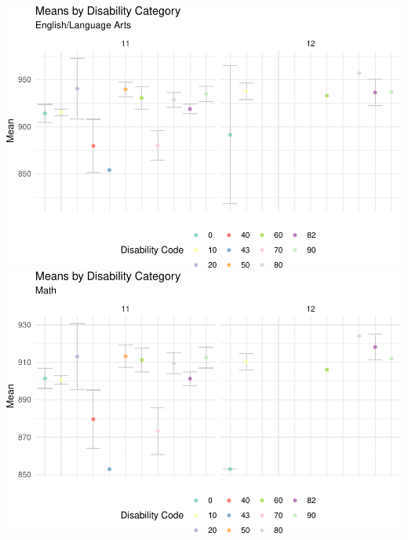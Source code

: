 \documentclass[]{article}
\begin{document}
\includegraphics{tech_report_18_files/figure-latex/plots11-1.pdf}
\includegraphics{tech_report_18_files/figure-latex/plots11-2.pdf}
\end{document}
